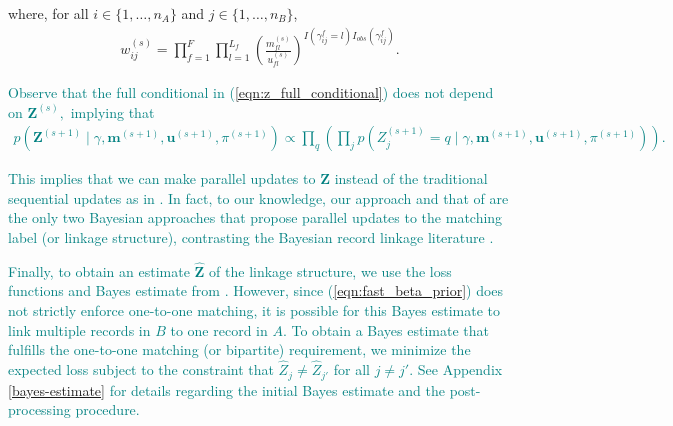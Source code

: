 \documentclass[ba]{imsart}
\begin{document}
where, for all $i \in \{1, \ldots, n_A\}$ and $j \in \{1, \ldots, n_B\}$, 
\begin{align}
	\label{eqn:fs_weight}
	w_{ij}^{(s)} = \prod_{f=1}^{F}\prod_{l = 1}^{L_f} \left(\frac{m_{fl}^{(s)}}{u_{fl}^{(s)}}\right)^{I(\gamma_{ij}^f = l)I_{obs}(\gamma_{ij}^f)}.
\end{align}

\textcolor{teal}{
Observe that the full conditional in (\ref{eqn:z_full_conditional}) does not depend on $\bm{Z}^{(s)},$ implying that 
\begin{align}
p(\bm{Z}^{(s+1)} \mid \gamma, \bm{m}^{(s+1)}, \bm{u}^{(s+1)}, \pi^{(s+1)}) \propto \prod_q \left(\prod_j
p\left(Z_j^{(s+1)}  = q \mid \gamma, \bm{m}^{(s+1)}, \bm{u}^{(s+1)}, \pi^{(s+1)} \right)
\right).
\end{align}
}

\textcolor{teal}{This implies that we can make parallel updates to $\bm{Z}$ instead of the traditional sequential updates as in \cite{sadinle_bayesian_2017}.
In fact, to our knowledge, our approach and that of \cite{wortman2019} are the only two Bayesian approaches that propose parallel updates to the matching label (or linkage structure), contrasting the Bayesian record linkage literature \citep{tancredi2011hierarchical, sadinle_detecting_2014, steorts_bayesian_2016, marchant_distributed_2019, zanella_flexible_2016, betancourt2022prior, aleshinguendel2021multifile}. }


\textcolor{teal}{Finally, to obtain an estimate $\hat{\bm{Z}}$ of the linkage structure, we use the loss functions and Bayes estimate from \cite{sadinle_bayesian_2017}. However, since (\ref{eqn:fast_beta_prior}) does not strictly enforce one-to-one matching, it is possible for this Bayes estimate to link multiple records in $B$ to one record in $A$. To obtain a Bayes estimate that fulfills the one-to-one matching (or bipartite) requirement, we minimize the expected loss subject to the constraint that $\hat{Z}_j \neq \hat{Z}_{j'}$ for all $j \neq j'$. See Appendix \ref{bayes-estimate} for details regarding the initial Bayes estimate and the post-processing procedure.}

\end{document}
